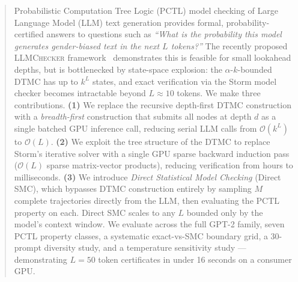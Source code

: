 \documentclass{article}
\newcommand{\bigO}{\mathcal{O}}
\begin{document}

\printAffiliationsAndNotice{\icmlanonymize}

\begin{abstract}
Probabilistic Computation Tree Logic (PCTL) model checking of Large Language
Model (LLM) text generation provides formal, probability-certified answers to
questions such as \emph{``What is the probability this model generates
gender-biased text in the next $L$ tokens?''}
The recently proposed \textsc{LLMChecker} framework~\citep{gross2025llmchecker}
demonstrates this is feasible for small lookahead depths, but is bottlenecked by
state-space explosion: the $\alpha$-$k$-bounded DTMC has up to $k^L$ states,
and exact verification via the Storm model checker becomes intractable beyond
$L \approx 10$ tokens.
We make three contributions.
\textbf{(1)} We replace the recursive depth-first DTMC construction with a
\emph{breadth-first} construction that submits all nodes at depth $d$ as a
single batched GPU inference call, reducing serial LLM calls from $\bigO(k^L)$
to $\bigO(L)$.
\textbf{(2)} We exploit the tree structure of the DTMC to replace Storm's
iterative solver with a single GPU sparse backward induction pass
($\bigO(L)$ sparse matrix-vector products), reducing verification from hours
to milliseconds.
\textbf{(3)} We introduce \emph{Direct Statistical Model Checking} (Direct
SMC), which bypasses DTMC construction entirely by sampling $M$ complete
trajectories directly from the LLM, then evaluating the PCTL property on each.
Direct SMC scales to any $L$ bounded only by the model's context window.
We evaluate across the full GPT-2 family, seven PCTL property classes, a
systematic exact-vs-SMC boundary grid, a 30-prompt diversity study, and a
temperature sensitivity study — demonstrating $L=50$ token certificates in
under 16 seconds on a consumer GPU.
\end{abstract}
\end{document}
